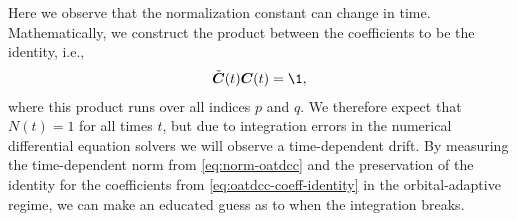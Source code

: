             Here we observe that the normalization constant can change in time.
            Mathematically, we construct the product between the coefficients to
            be the identity, i.e.,
            \begin{align}
                \tilde{\vfg{C}}(t)\vfg{C}(t)
                = \1,
                \label{eq:oatdcc-coeff-identity}
            \end{align}
            where this product runs over all indices $p$ and $q$.
            We therefore expect that $N(t) = 1$ for all times $t$, but due to
            integration errors in the numerical differential equation solvers we
            will observe a time-dependent drift.
            By measuring the time-dependent norm from \autoref{eq:norm-oatdcc}
            and the preservation of the identity for the coefficients from
            \autoref{eq:oatdcc-coeff-identity} in the orbital-adaptive regime,
            we can make an educated guess as to when the integration breaks.

